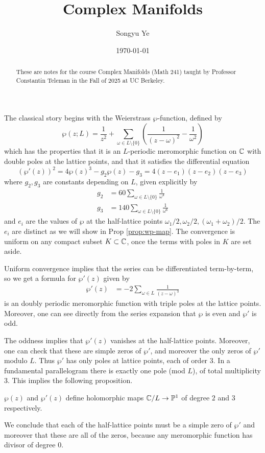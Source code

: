 \documentclass[12pt]{article}
\begin{document}
\rhead{\today}
\cfoot{\thepage}

\title{Complex Manifolds}

\author{Songyu Ye}
\date{\today}
\maketitle


\begin{abstract}
    These are notes for the course Complex Manifolds (Math 241) taught by Professor Constantin Teleman in the Fall of 2025 at UC Berkeley.
\end{abstract}

\tableofcontents
\section{}
The classical story begins with the Weierstrass $\wp$-function, defined by
\[\wp(z;L) = \frac{1}{z^2} + \sum_{\omega \in L\setminus\{0\}} \left(\frac{1}{(z-\omega)^2} - \frac{1}{\omega^2}\right)\]
which has the properties that it is an $L$-periodic meromorphic function on $\mathbb{C}$ with double poles at the lattice points, and that it satisfies the differential equation
\[(\wp'(z))^2 = 4\wp(z)^3 - g_2\wp(z) - g_3 = 4(z - e_1)(z - e_2)(z - e_3)\]
where $g_2,g_3$ are constants depending on $L$, given explicitly by \begin{align*}
    g_2 & = 60\sum_{\omega \in L\setminus\{0\}} \frac{1}{\omega^4} \\
    g_3 & = 140\sum_{\omega \in L\setminus\{0\}} \frac{1}{\omega^6}
\end{align*} and $e_i$ are the values of $\wp$ at the half-lattice points $\omega_1/2, \omega_2/2, (\omega_1+\omega_2)/2$. The $e_i$ are distinct as we will show in Prop \ref{prop:wp-map}.
The convergence is uniform on any compact subset $K \subset \mathbb{C}$, once the terms with poles in $K$ are set aside.

Uniform convergence implies that the series can be differentiated term-by-term, so we get a formula for $\wp'(z)$ given by \begin{align*}
    \wp'(z) & = -2\sum_{\omega \in L} \frac{1}{(z-\omega)^3}
\end{align*} is an doubly periodic meromorphic function with triple poles at the lattice points. Moreover, one can see directly from the series expansion that $\wp$ is even and $\wp'$ is odd.

The oddness implies that $\wp'(z)$ vanishes at the half-lattice points. Moreover, one can check that these are simple zeros of $\wp'$, and moreover the only zeros of $\wp'$ modulo $L$. Thus $\wp'$ has only poles at lattice points, each of order 3. In a fundamental parallelogram there is exactly one pole (mod $L$), of total multiplicity 3. This implies the following proposition.
\begin{proposition}
    $\wp(z)$ and $\wp'(z)$ define holomorphic maps $\mathbb{C}/L \to \mathbb{P}^1$ of degree $2$ and $3$ respectively.
\end{proposition}
We conclude that each of the half-lattice points must be a simple zero of $\wp'$ and moreover that these are all of the zeros, because any meromorphic function has divisor of degree 0.
\end{document}

